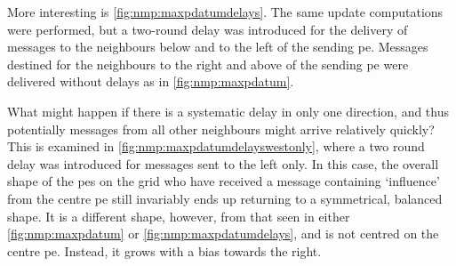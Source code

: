 More interesting is \cref{fig:nmp:maxpdatumdelays}.  The same update computations were performed, but a two-round delay was introduced for the delivery of messages to the neighbours below and to the left of the sending \gls{pe}.  Messages destined for the neighbours to the right and above of the sending \gls{pe} were delivered without delays as in \cref{fig:nmp:maxpdatum}.

What might happen if there is a systematic delay in only one direction, and thus potentially messages from all other neighbours might arrive relatively quickly?  This is examined in \cref{fig:nmp:maxpdatumdelayswestonly}, where a two round delay was introduced for messages sent to the left only.  In this case, the overall shape of the \glspl{pe} on the grid who have received a message containing `influence' from the centre \gls{pe} still invariably ends up returning to a symmetrical, balanced shape.  It is a different shape, however, from that seen in either \cref{fig:nmp:maxpdatum} or \cref{fig:nmp:maxpdatumdelays}, and is not centred on the centre \gls{pe}.  Instead, it grows with a bias towards the right.

